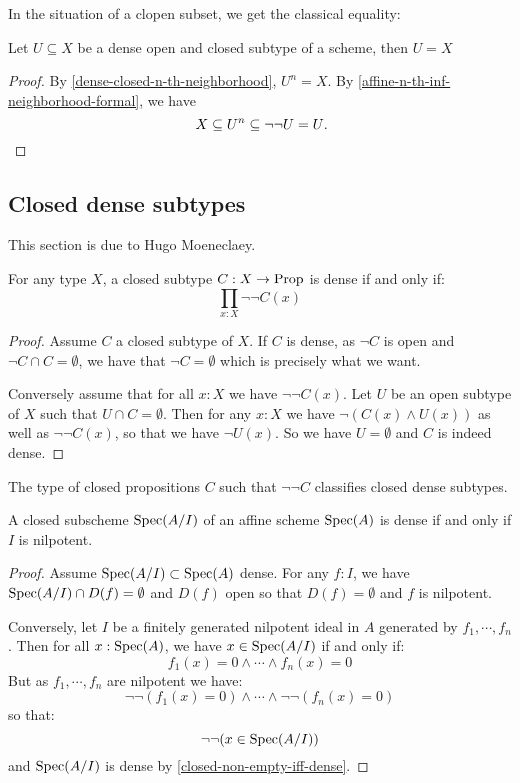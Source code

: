 In the situation of a clopen subset, we get the classical equality:

\begin{lemma}%
  \label{clopen-dense-is-all}
  Let $U\subseteq X$ be a dense open and closed subtype of a scheme,
  then $U=X$
\end{lemma}

\begin{proof}
  By \cref{dense-closed-n-th-neighborhood},
  $U^n=X$.
  By \cref{affine-n-th-inf-neighborhood-formal}, we have
  \[
    X\subseteq U^n\subseteq \neg\neg U = U\rlap{.}
  \]
\end{proof}


\subsection{Closed dense subtypes}

This section is due to Hugo Moeneclaey.

\begin{lemma}
\label{closed-non-empty-iff-dense}
For any type $X$, a closed subtype $C : X \to \mathrm{Prop}$ is dense if and only if:
\[
\prod_{x:X} \neg\neg C(x)
\]
\end{lemma}

\begin{proof}
Assume $C$ a closed subtype of $X$. 
If $C$ is dense, as $\neg C$ is open and $\neg C \cap C = \emptyset$, we have that $\neg C = \emptyset$ which is precisely what we want.

Conversely assume that for all $x:X$ we have $\neg\neg C(x)$. Let $U$ be an open subtype of $X$ such that $U\cap C = \emptyset$. Then for any $x:X$ we have $\neg(C(x)\land U(x))$ as well as $\neg\neg C(x)$, so that we have $\neg U(x)$. So we have $U=\emptyset$ and $C$ is indeed dense.
\end{proof}

\begin{corollary}
The type of closed propositions $C$ such that $\neg\neg C$ classifies closed dense subtypes.
\end{corollary}

\begin{proposition}
A closed subscheme $\operatorname{Spec}(A/I)$ of an affine scheme $\operatorname{Spec}(A)$ is dense if and only if $I$ is nilpotent.
\end{proposition}

\begin{proof}
Assume $\operatorname{Spec}(A/I)\subset \operatorname{Spec}(A)$ dense. For any $f:I$, we have $\operatorname{Spec}(A/I)\cap D(f)=\emptyset$ and $D(f)$ open so that $D(f)=\emptyset$ and $f$ is nilpotent.

Conversely, let $I$ be a finitely generated nilpotent ideal in $A$ generated by $f_1,\cdots,f_n$. Then for all $x:\operatorname{Spec}(A)$, we have $x\in\operatorname{Spec}(A/I)$ if and only if:
\[
f_1(x)=0\land\cdots\land f_n(x)=0
\]
But as $f_1,\cdots,f_n$ are nilpotent we have:
\[
\neg\neg (f_1(x)=0)\land\cdots\land \neg\neg(f_n(x)=0)
\]
so that:
\[
\neg\neg(x\in\operatorname{Spec}(A/I))
\]
and $\operatorname{Spec}(A/I)$ is dense by \cref{closed-non-empty-iff-dense}.
\end{proof}

